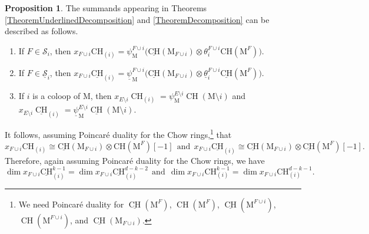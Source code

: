 \documentclass[11pt,reqno]{amsart}
\theoremstyle{definition}
\newtheorem{proposition}[theorem]{Proposition}
\theoremstyle{remark}
\renewcommand{\dim}{\operatorname{dim}}
\renewcommand{\(}{\left(}
\renewcommand{\)}{\right)}
\newcommand{\<}{\left<}
\renewcommand{\>}{\right>}
\newcommand{\CH}{\operatorname{CH}}
\newcommand{\uCH}{\underline{\CH}}
\begin{document}
\begin{proposition}\label{lem:top degree vanishing}
The summands appearing in Theorems  \ref{TheoremUnderlinedDecomposition} and \ref{TheoremDecomposition} can be described as follows.%
\begin{enumerate}[(1)]\itemsep 5pt
\item If $F \in \mathscr{S}_i$, %
then $x_{F\cup i}\mathrm{CH}_{(i)} = \psi_\mathrm{M}^{F\cup i}\big(\underline{\mathrm{CH}}(\mathrm{M}_{F\cup i}) \otimes \theta_i^{F \cup i}\mathrm{CH}(\mathrm{M}^{F})\big)$.
\item If $F \in \underline{\mathscr{S}}_i$, %
then $x_{F\cup i}\underline{\mathrm{CH}}_{(i)} = \underline{\psi}_\mathrm{M}^{F\cup i}\big(\underline{\mathrm{CH}}(\mathrm{M}_{F\cup i}) \otimes  \underline{\theta}_i^{F \cup i}\underline{\mathrm{CH}}(\mathrm{M}^{F})\big)$.
\item If $i$ is a coloop of $\mathrm{M}$, then %
$x_{E \setminus i} \CH_{(i)}=\psi^{E \setminus i}_\mathrm{M} \CH(\mathrm{M} \setminus i)$
and
$x_{E \setminus i} \underline{\CH}_{(i)}=\underline{\psi}^{E \setminus i}_\mathrm{M} \underline{\CH}(\mathrm{M} \setminus i)$.
\end{enumerate}
\end{proposition}

It follows, assuming Poincar\'e duality for the Chow rings,\footnote{We need Poincar\'e duality for $\uCH(\mathrm{M}^F)$, $\CH(\mathrm{M}^F)$,  $\uCH(\mathrm{M}^{F \cup i})$, $\CH(\mathrm{M}^{F \cup i})$,  and
$\uCH(\mathrm{M}_{F \cup i})$.} that
\[
x_{F\cup i}\mathrm{CH}_{(i)}  \cong \underline{\mathrm{CH}}(\mathrm{M}_{F\cup i}) \otimes \mathrm{CH}(\mathrm{M}^{F})[-1]
\ \ \text{and} \ \ 
x_{F\cup i}\underline{\mathrm{CH}}_{(i)}  \cong \underline{\mathrm{CH}}(\mathrm{M}_{F\cup i}) \otimes \underline{\mathrm{CH}}(\mathrm{M}^{F})[-1].
\]
Therefore, again assuming Poincar\'e duality for the Chow rings,  we have
\[
\dim  x_{F\cup i}\underline{\mathrm{CH}}^{k-1}_{(i)}  = \dim  x_{F\cup i}\underline{\mathrm{CH}}_{(i)}^{d-k-2}
\ \ \text{and} \ \ 
\dim  x_{F\cup i}\mathrm{CH}^{k-1}_{(i)}  = \dim  x_{F\cup i}\mathrm{CH}_{(i)}^{d-k-1}.
\]
\end{document}
